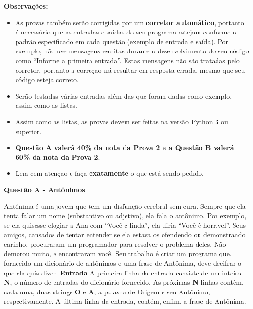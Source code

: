 \documentclass[a4paper, 12pt]{article}
\begin{document}
\textbf{{\large Observações:}}
\begin{itemize}
	\item As provas também serão corrigidas por um \textbf{corretor automático}, portanto é necessário que as entradas e saídas do seu programa estejam conforme o padrão especificado em cada questão (exemplo de entrada e saída). Por exemplo, não use mensagens escritas durante o desenvolvimento do seu código como “Informe a primeira entrada”. Estas mensagens não são tratadas pelo corretor, portanto a correção irá resultar em resposta errada, mesmo que seu código esteja correto.
	\item Serão testadas várias entradas além das que foram dadas como exemplo, assim como as listas.
	\item Assim como as listas, as provas devem ser feitas na versão Python 3 ou superior.
	\item \textbf{Questão A valerá 40\% da nota da Prova 2 e a Questão B valerá 60\% da nota da Prova 2}.
	\item Leia com atenção e faça \textbf{exatamente} o que está sendo pedido.
\end{itemize}
\newpage %
\begin{center}
\textbf{{\Large Questão A - Antônimos}}
\end{center}
\vspace{5pt}
Antônima é uma jovem que tem um disfunção cerebral sem cura. Sempre que ela
tenta falar um nome (substantivo ou adjetivo), ela fala o antônimo. Por exemplo, se
ela quisesse elogiar a Ana com ``Você é linda'', ela diria ``Você é horrível''. \newline \newline
Seus amigos, cansados de tentar entender se ela estava os ofendendo ou
demonstrando carinho, procuraram um programador para resolver o problema
deles. Não demorou muito, e encontraram você. Seu trabalho é criar um programa que,
fornecido um dicionário de antônimos e uma frase de Antônima, deve decifrar o
que ela quis dizer.
\newline \newline
\textbf{{\large Entrada}} \newline
A primeira linha da entrada consiste de um inteiro \textbf{N}, o número de entradas do
dicionário fornecido. \newline
As próximas \textbf{N} linhas contêm, cada uma, duas strings \textbf{O} e \textbf{A}, a palavra de Origem
e seu Antônimo, respectivamente. \newline
A última linha da entrada, contém, enfim, a frase de Antônima. \newline
\end{document}
